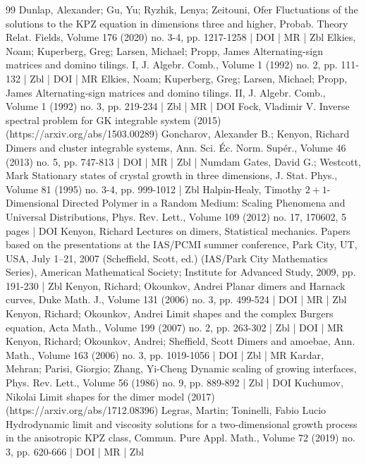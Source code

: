 \documentclass[10pt]{amsart}
\theoremstyle{definition}\newtheorem{defi}[theo]{Definition}\newtheorem{rema}[theo]{Remark}\newtheorem{exam}[theo]{Example}\newtheorem{exem}[theo]{Example}\newtheorem{nota}[theo]{Notation}
\begin{document}
\begin{thebibliography}{99}
Dunlap, Alexander; Gu, Yu; Ryzhik, Lenya; Zeitouni, Ofer Fluctuations of the solutions to the KPZ equation in dimensions three and higher, Probab. Theory Relat. Fields, Volume 176 (2020) no. 3-4, pp. 1217-1258 | DOI | MR | Zbl
Elkies, Noam; Kuperberg, Greg; Larsen, Michael; Propp, James Alternating-sign matrices and domino tilings. I, J. Algebr. Comb., Volume 1 (1992) no. 2, pp. 111-132 | Zbl | DOI | MR
Elkies, Noam; Kuperberg, Greg; Larsen, Michael; Propp, James Alternating-sign matrices and domino tilings. II, J. Algebr. Comb., Volume 1 (1992) no. 3, pp. 219-234 | Zbl | MR | DOI
Fock, Vladimir V. Inverse spectral problem for GK integrable system (2015) (https://arxiv.org/abs/1503.00289)
Goncharov, Alexander B.; Kenyon, Richard Dimers and cluster integrable systems, Ann. Sci. Éc. Norm. Supér., Volume 46 (2013) no. 5, pp. 747-813 | DOI | MR | Zbl | Numdam
Gates, David G.; Westcott, Mark Stationary states of crystal growth in three dimensions, J. Stat. Phys., Volume 81 (1995) no. 3-4, pp. 999-1012 | Zbl
Halpin-Healy, Timothy $2+1$-Dimensional Directed Polymer in a Random Medium: Scaling Phenomena and Universal Distributions, Phys. Rev. Lett., Volume 109 (2012) no. 17, 170602, 5 pages | DOI
Kenyon, Richard Lectures on dimers, Statistical mechanics. Papers based on the presentations at the IAS/PCMI summer conference, Park City, UT, USA, July 1–21, 2007 (Scheffield, Scott, ed.) (IAS/Park City Mathematics Series), American Mathematical Society; Institute for Advanced Study, 2009, pp. 191-230 | Zbl
Kenyon, Richard; Okounkov, Andrei Planar dimers and Harnack curves, Duke Math. J., Volume 131 (2006) no. 3, pp. 499-524 | DOI | MR | Zbl
Kenyon, Richard; Okounkov, Andrei Limit shapes and the complex Burgers equation, Acta Math., Volume 199 (2007) no. 2, pp. 263-302 | Zbl | DOI | MR
Kenyon, Richard; Okounkov, Andrei; Sheffield, Scott Dimers and amoebae, Ann. Math., Volume 163 (2006) no. 3, pp. 1019-1056 | DOI | Zbl | MR
Kardar, Mehran; Parisi, Giorgio; Zhang, Yi-Cheng Dynamic scaling of growing interfaces, Phys. Rev. Lett., Volume 56 (1986) no. 9, pp. 889-892 | Zbl | DOI
Kuchumov, Nikolai Limit shapes for the dimer model (2017) (https://arxiv.org/abs/1712.08396)
Legras, Martin; Toninelli, Fabio Lucio Hydrodynamic limit and viscosity solutions for a two-dimensional growth process in the anisotropic KPZ class, Commun. Pure Appl. Math., Volume 72 (2019) no. 3, pp. 620-666 | DOI | MR | Zbl

\end{thebibliography}
\end{document}
